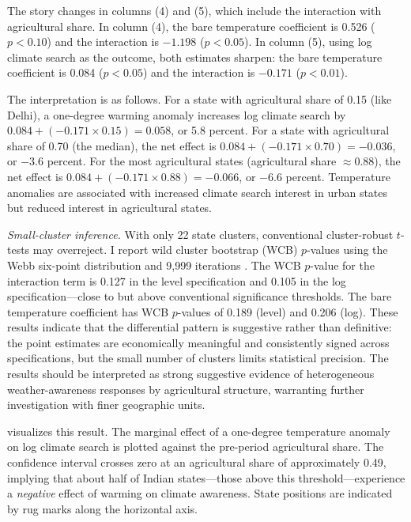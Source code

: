 \documentclass[12pt]{article}
\begin{document}
The story changes in columns (4) and (5), which include the interaction with agricultural share. In column (4), the bare temperature coefficient is 0.526 ($p < 0.10$) and the interaction is $-1.198$ ($p < 0.05$). In column (5), using log climate search as the outcome, both estimates sharpen: the bare temperature coefficient is 0.084 ($p < 0.05$) and the interaction is $-0.171$ ($p < 0.01$).

The interpretation is as follows. For a state with agricultural share of 0.15 (like Delhi), a one-degree warming anomaly increases log climate search by $0.084 + (-0.171 \times 0.15) = 0.058$, or 5.8 percent. For a state with agricultural share of 0.70 (the median), the net effect is $0.084 + (-0.171 \times 0.70) = -0.036$, or $-3.6$ percent. For the most agricultural states (agricultural share $\approx 0.88$), the net effect is $0.084 + (-0.171 \times 0.88) = -0.066$, or $-6.6$ percent. Temperature anomalies are associated with increased climate search interest in urban states but reduced interest in agricultural states.

\textit{Small-cluster inference.} With only 22 state clusters, conventional cluster-robust $t$-tests may overreject. I report wild cluster bootstrap (WCB) $p$-values using the Webb six-point distribution and 9,999 iterations \citep{cameron2008bootstrap}. The WCB $p$-value for the interaction term is 0.127 in the level specification and 0.105 in the log specification---close to but above conventional significance thresholds. The bare temperature coefficient has WCB $p$-values of 0.189 (level) and 0.206 (log). These results indicate that the differential pattern is suggestive rather than definitive: the point estimates are economically meaningful and consistently signed across specifications, but the small number of clusters limits statistical precision. The results should be interpreted as strong suggestive evidence of heterogeneous weather-awareness responses by agricultural structure, warranting further investigation with finer geographic units.



 visualizes this result. The marginal effect of a one-degree temperature anomaly on log climate search is plotted against the pre-period agricultural share. The confidence interval crosses zero at an agricultural share of approximately 0.49, implying that about half of Indian states---those above this threshold---experience a \textit{negative} effect of warming on climate awareness. State positions are indicated by rug marks along the horizontal axis.
\end{document}
